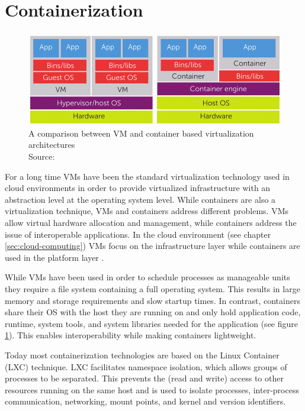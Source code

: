 \section{Containerization}

\begin{figure}
  \centering
  \includegraphics{resources/vm-vs-container.png}
  \caption{
    A comparison between VM and container based virtualization architectures\\
    Source:  \cite{ieee-containers}
  }
  \label{fig:vm-vs-container}
\end{figure}

For a long time VMs have been the standard virtualization technology used in
cloud environments in order to provide virtualized infrastructure with an
abstraction level at the operating system level. While containers are also a
virtualization technique, VMs and containers address different problems. VMs
allow virtual hardware allocation and management, while containers address the
issue of interoperable applications. In the cloud environment (see chapter
\ref{sec:cloud-computing}) VMs focus on the infrastructure layer while
containers are used in the platform layer \cite{ieee-containers}.

While VMs have been used in order to schedule processes as manageable units they
require a file system containing a full operating system. This results in large
memory and storage requirements and slow startup times. In contrast, containers
share their OS with the host they are running on and only hold application code,
runtime, system tools, and system libraries needed for the application (see
figure \ref{fig:vm-vs-container}). This enables interoperability while making
containers lightweight.

Today most containerization technologies are based on the Linux Container (LXC)
technique. LXC facilitates namespace isolation, which allows groups of processes
to be separated. This prevents the (read and write) access to other resources
running on the same host and is used to isolate processes, inter-process
communication, networking, mount points, and kernel and version identifiers.

